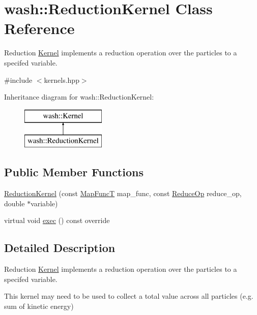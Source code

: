 \hypertarget{classwash_1_1ReductionKernel}{}\section{wash\+:\+:Reduction\+Kernel Class Reference}
\label{classwash_1_1ReductionKernel}


Reduction \mbox{\hyperlink{classwash_1_1Kernel}{Kernel}} implements a reduction operation over the particles to a specifed variable.  




{\ttfamily \#include $<$kernels.\+hpp$>$}

Inheritance diagram for wash\+:\+:Reduction\+Kernel\+:\begin{figure}[H]
\begin{center}
\leavevmode
\includegraphics[height=2.000000cm]{classwash_1_1ReductionKernel}
\end{center}
\end{figure}
\subsection*{Public Member Functions}
\begin{DoxyCompactItemize}
\item 
\mbox{\hyperlink{classwash_1_1ReductionKernel_a107edb65b63afdbc530718b5d3e901d6}{Reduction\+Kernel}} (const \mbox{\hyperlink{namespacewash_ad515914307c88c01ff7524c57feabf83}{Map\+FuncT}} map\+\_\+func, const \mbox{\hyperlink{namespacewash_a9c59e8c142d63d8640921c1b1957807e}{Reduce\+Op}} reduce\+\_\+op, double $\ast$variable)
\item 
virtual void \mbox{\hyperlink{classwash_1_1ReductionKernel_a3ead90df8748700f40b2e6820e8e7e91}{exec}} () const override
\end{DoxyCompactItemize}


\subsection{Detailed Description}
Reduction \mbox{\hyperlink{classwash_1_1Kernel}{Kernel}} implements a reduction operation over the particles to a specifed variable. 

This kernel may need to be used to collect a total value across all particles (e.\+g. sum of kinetic energy) 

